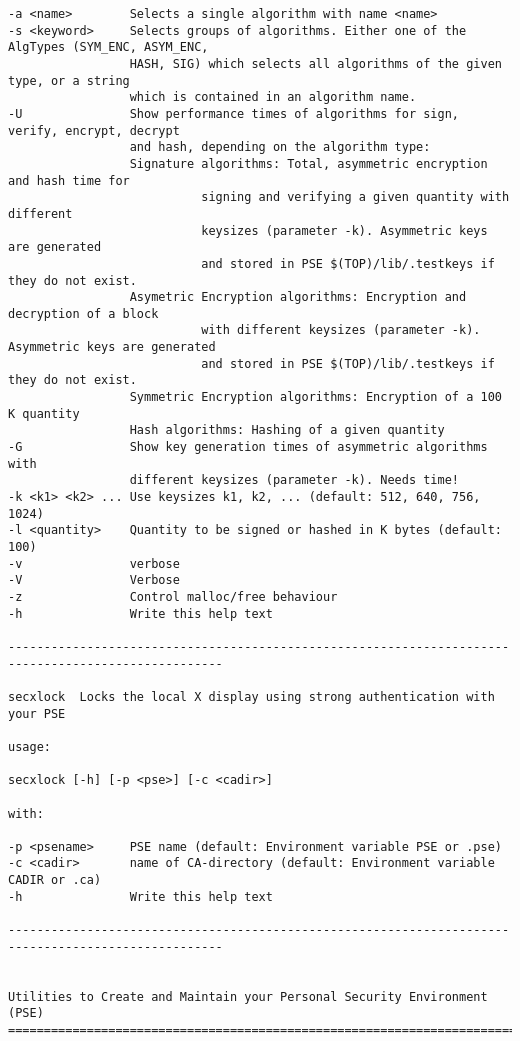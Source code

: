 {\begin{verbatim}
-a <name>        Selects a single algorithm with name <name>
-s <keyword>     Selects groups of algorithms. Either one of the AlgTypes (SYM_ENC, ASYM_ENC,
                 HASH, SIG) which selects all algorithms of the given type, or a string
                 which is contained in an algorithm name.
-U               Show performance times of algorithms for sign, verify, encrypt, decrypt
                 and hash, depending on the algorithm type:
                 Signature algorithms: Total, asymmetric encryption and hash time for
                           signing and verifying a given quantity with different
                           keysizes (parameter -k). Asymmetric keys are generated
                           and stored in PSE $(TOP)/lib/.testkeys if they do not exist.
                 Asymetric Encryption algorithms: Encryption and decryption of a block
                           with different keysizes (parameter -k). Asymmetric keys are generated
                           and stored in PSE $(TOP)/lib/.testkeys if they do not exist.
                 Symmetric Encryption algorithms: Encryption of a 100 K quantity
                 Hash algorithms: Hashing of a given quantity
-G               Show key generation times of asymmetric algorithms with
                 different keysizes (parameter -k). Needs time!
-k <k1> <k2> ... Use keysizes k1, k2, ... (default: 512, 640, 756, 1024)
-l <quantity>    Quantity to be signed or hashed in K bytes (default: 100)
-v               verbose
-V               Verbose
-z               Control malloc/free behaviour
-h               Write this help text

----------------------------------------------------------------------------------------------------

secxlock  Locks the local X display using strong authentication with your PSE

usage:

secxlock [-h] [-p <pse>] [-c <cadir>]

with:

-p <psename>     PSE name (default: Environment variable PSE or .pse)
-c <cadir>       name of CA-directory (default: Environment variable CADIR or .ca)
-h               Write this help text

----------------------------------------------------------------------------------------------------


Utilities to Create and Maintain your Personal Security Environment (PSE)
=========================================================================


\end{verbatim}}
